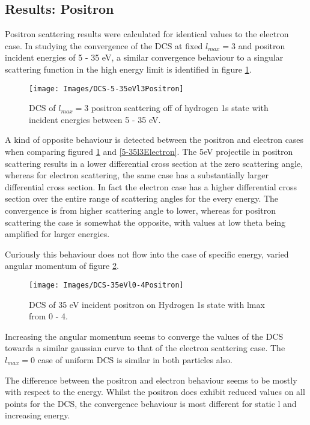 \documentclass{article}
\begin{document}
     \subsection{Results: Positron}
     
     Positron scattering results were calculated for identical values to the electron case. In studying the convergence of the DCS at fixed $l_{max} =3$ and positron incident energies of 5 - 35 eV, a similar convergence behaviour to a singular scattering function in the high energy limit is identified in figure \ref{5-35l3Positron}. 
 
     \begin{figure}[H]
     	\centering
     	\texttt{[image: Images/DCS-5-35eVl3Positron]}
     	\caption{DCS of $l_{max}=3$ positron scattering off of hydrogen 1s state with incident energies between 5 - 35 eV. \label{5-35l3Positron}}
     \end{figure}
     
     A kind of opposite behaviour is detected between the positron and electron cases when comparing figured \ref{5-35l3Positron} and \ref{5-35l3Electron}. The 5eV projectile in positron scattering results in a lower differential cross section at the zero scattering angle, whereas for electron scattering, the same case has a substantially larger differential cross section. In fact the electron case has a higher differential cross section over the entire range of scattering angles for the every energy. The convergence is from higher scattering angle to lower, whereas for positron scattering the case is somewhat the opposite, with values at low theta being amplified for larger energies.
     
     Curiously this behaviour does not flow into the case of specific energy, varied angular momentum of figure \ref{35evl0-3Positron}. 
     
     \begin{figure}[H]
     	\centering
     	\texttt{[image: Images/DCS-35eVl0-4Positron]}
     	\caption{DCS of 35 eV incident positron on Hydrogen 1s state with lmax from 0 - 4. \label{35evl0-3Positron}}
     \end{figure}
     
     Increasing the angular momentum seems to converge the values of the DCS towards a similar gaussian curve to that of the electron scattering case. The $l_{max}=0$ case of uniform DCS is similar in both particles also. 
     
     The difference between the positron and electron behaviour seems to be mostly with respect to the energy. Whilst the positron does exhibit reduced values on all points for the DCS, the convergence behaviour is most different for static l and increasing energy.
     
\end{document}
